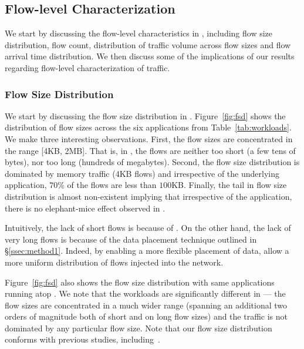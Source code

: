 \subsection{Flow-level Characterization} 
\label{ssec:flc}
We start by discussing the flow-level characteristics in \dis, including flow size distribution, flow count, distribution of traffic volume across flow sizes and flow arrival time distribution. We then discuss some of the implications of our results regarding flow-level characterization of \dis traffic.

\subsubsection{Flow Size Distribution}
We start by discussing the flow size distribution in \dis. Figure~\ref{fig:fsd} shows the distribution of flow sizes across the six applications from Table~\ref{tab:workloads}. We make three interesting observations. First, the flow sizes are concentrated in the range [4KB, 2MB]. That is, in \dis, the flows are neither too short (a few tens of bytes), nor too long (hundreds of megabytes). Second, the flow size distribution is dominated by memory traffic (4KB flows) and irrespective of the underlying application, $70\%$ of the flows are less than $100$KB. Finally, the tail in flow size distribution is almost non-existent implying that irrespective of the application, there is no elephant-mice effect observed in \dis.

Intuitively, the lack of short flows is because of . On the other hand, the lack of very long flows is because of the data placement technique outlined in \S\ref{ssec:method1}. Indeed, by enabling a more flexible placement of data, \dis allow a more uniform distribution of flows injected into the network.

Figure~\ref{fig:fsd} also shows the flow size distribution with same applications running atop \pdis. We note that the workloads are significantly different in \pdis --- the flow sizes are concentrated in a much wider range (spanning an additional two orders of magnitude both of short and on long flow sizes) and the traffic is not dominated by any particular flow size. Note that our flow size distribution conforms with previous studies, including~\cite{imc-srikant, imc-theo}.

